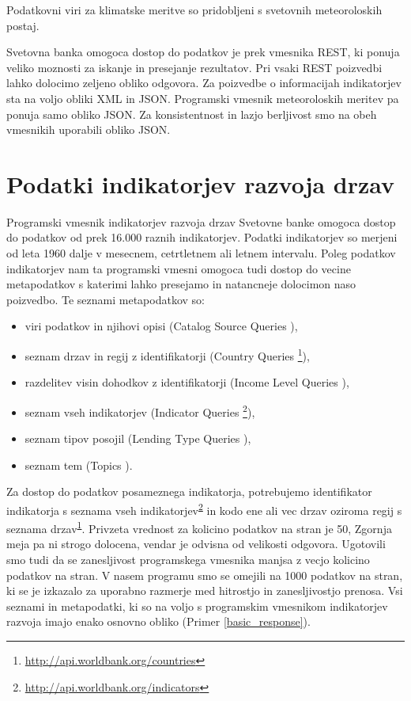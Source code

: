 Podatkovni viri za klimatske meritve so pridobljeni s svetovnih meteoroloskih 
postaj.


Svetovna banka omogoca dostop do podatkov je prek vmesnika REST, ki ponuja 
veliko moznosti za iskanje in presejanje rezultatov. Pri vsaki REST poizvedbi
lahko dolocimo zeljeno obliko odgovora. Za poizvedbe o informacijah 
indikatorjev sta na voljo obliki XML in JSON. Programski vmesnik meteoroloskih
meritev pa ponuja samo obliko JSON. Za konsistentnost in lazjo berljivost smo
na obeh vmesnikih uporabili obliko JSON. 



\section{Podatki indikatorjev razvoja drzav}



Programski vmesnik indikatorjev razvoja drzav Svetovne banke omogoca dostop
do podatkov od prek 16.000 raznih indikatorjev. Podatki indikatorjev so merjeni
od leta 1960 dalje v mesecnem, cetrtletnem ali letnem intervalu. Poleg podatkov
indikatorjev nam ta programski vmesni omogoca tudi dostop do vecine
metapodatkov s katerimi lahko presejamo in natancneje dolocimon naso poizvedbo.
Te seznami metapodatkov so:
\begin{itemize}
\item viri podatkov in njihovi opisi (Catalog Source Queries
	),
\item seznam drzav in regij z identifikatorji (Country Queries
	\footnote{\label{country_list}\url{http://api.worldbank.org/countries}}),
\item razdelitev visin dohodkov z identifikatorji (Income Level Queries
	),
\item seznam vseh indikatorjev (Indicator Queries
    \footnote{\label{indicators_list}\url{http://api.worldbank.org/indicators}}),
\item seznam tipov posojil (Lending Type Queries
	),
\item seznam tem (Topics ).
\end{itemize}


Za dostop do podatkov posameznega indikatorja, potrebujemo identifikator
indikatorja s seznama vseh indikatorjev\textsuperscript{\ref{indicators_list}} in kodo ene ali vec
drzav oziroma regij s seznama drzav\textsuperscript{\ref{country_list}}. Privzeta vrednost za
kolicino podatkov na stran je 50, Zgornja meja pa ni strogo dolocena, vendar
je odvisna od velikosti odgovora. Ugotovili smo tudi da se zanesljivost
programskega vmesnika manjsa z vecjo kolicino podatkov na stran. V nasem 
programu smo se omejili na 1000 podatkov na stran, ki se je izkazalo za 
uporabno razmerje med hitrostjo in zanesljivostjo prenosa. Vsi seznami in 
metapodatki, ki so na voljo s programskim vmesnikom indikatorjev razvoja imajo
enako osnovno obliko (Primer \ref{basic_response}).


